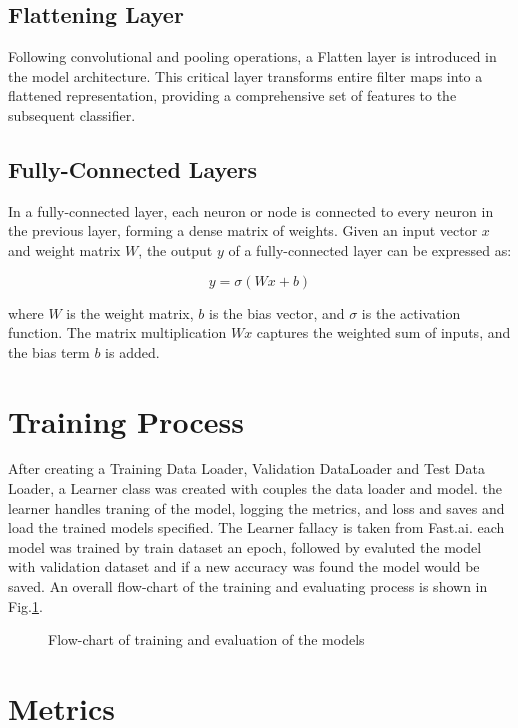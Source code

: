 \subsection{Flattening Layer}
Following convolutional and pooling operations, a Flatten layer is introduced in the model architecture. This critical layer transforms entire filter maps into a flattened representation, providing a comprehensive set of features to the subsequent classifier.

\subsection{Fully-Connected Layers}
In a fully-connected layer, each neuron or node is connected to every neuron in the previous layer, forming a dense matrix of weights. Given an input vector \(x\) and weight matrix \(W\), the output \(y\) of a fully-connected layer can be expressed as:

\begin{equation}
	y = \sigma(Wx + b)
\end{equation}

where \(W\) is the weight matrix, \(b\) is the bias vector, and \(\sigma\) is the activation function. The matrix multiplication \(Wx\) captures the weighted sum of inputs, and the bias term \(b\) is added.

\section{Training Process}
After creating a Training Data Loader, Validation DataLoader and Test Data Loader, a Learner class was created with couples the data loader and model. the learner handles traning of the model, logging the metrics, and loss and saves and load the trained models specified. The Learner fallacy is taken from Fast.ai\cite{howard2018fastai}. each model was trained by train dataset an epoch, followed by evaluted the model with validation dataset and if a new accuracy was found the model would be saved. An overall flow-chart of the training and evaluating process is shown in Fig.\ref{fig:train}.

\begin{figure}
	\centering
	
	\caption{Flow-chart of training and evaluation of the models}
	\label{fig:train}
\end{figure}
\section{Metrics}

